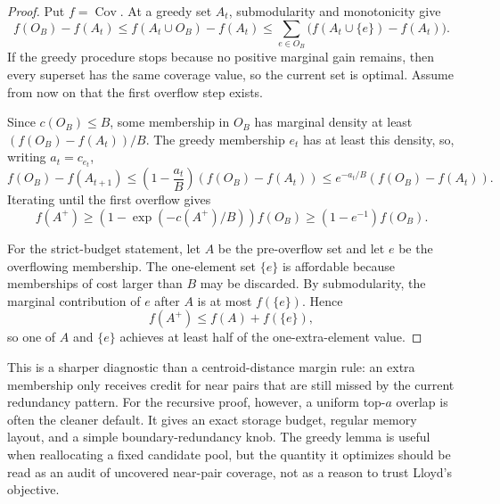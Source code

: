 \documentclass[10pt]{article}
\theoremstyle{definition}
\begin{document}
\begin{proof}
   Put $f=\operatorname{Cov}$. At a greedy set $A_t$, submodularity and
   monotonicity give
   \[
      f(O_B)-f(A_t)
      \le
      f(A_t\cup O_B)-f(A_t)
      \le
      \sum_{e\in O_B}\bigl(f(A_t\cup\{e\})-f(A_t)\bigr).
   \]
   If the greedy procedure stops because no positive marginal gain remains,
   then every superset has the same coverage value, so the current set is
   optimal. Assume from now on that the first overflow step exists.

   Since $c(O_B)\le B$, some membership in $O_B$ has marginal density at least
   $(f(O_B)-f(A_t))/B$. The greedy membership $e_t$ has at least this density,
   so, writing $a_t=c_{e_t}$,
   \[
      f(O_B)-f(A_{t+1})
      \le
      \left(1-\frac{a_t}{B}\right)(f(O_B)-f(A_t))
      \le
      e^{-a_t/B}(f(O_B)-f(A_t)).
   \]
   Iterating until the first overflow gives
   \[
      f(A^+)\ge
      \left(1-\exp(-c(A^+)/B)\right)f(O_B)
      \ge
      (1-e^{-1})f(O_B).
   \]

   For the strict-budget statement, let $A$ be the pre-overflow set and let $e$
   be the overflowing membership. The one-element set $\{e\}$ is affordable
   because memberships of cost larger than $B$ may be discarded. By
   submodularity, the marginal contribution of $e$ after $A$ is at most
   $f(\{e\})$. Hence
   \[
      f(A^+)\le f(A)+f(\{e\}),
   \]
   so one of $A$ and $\{e\}$ achieves at least half of the one-extra-element
   value.
\end{proof}

This is a sharper diagnostic than a centroid-distance margin rule: an extra
membership only receives credit for near pairs that are still missed by the
current redundancy pattern.  For the recursive proof, however, a uniform
top-$a$ overlap is often the cleaner default.  It gives an exact storage
budget, regular memory layout, and a simple boundary-redundancy knob.  The
greedy lemma is useful when reallocating a fixed candidate pool, but the
quantity it optimizes should be read as an audit of uncovered near-pair
coverage, not as a reason to trust Lloyd's objective.
\end{document}
